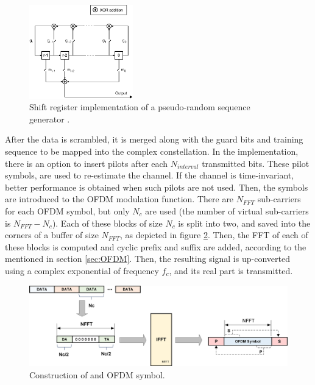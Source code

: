 \documentclass[12pt,a4paper,openright]{report}
\begin{document}
\begin{figure}[h]
  \centering
    \includegraphics[width=0.4\textwidth]{pnSeqGen.png}
    \caption[Shift register implementation of a pseudo-random sequence generator.]{Shift register implementation of a pseudo-random sequence generator \cite{MATLABpngen}.}
    \label{fig:PNgenerator}
\end{figure}


 
 After the data is scrambled, it is merged along with the guard bits and training sequence to be mapped into the complex constellation. In the implementation, there is an option to insert pilots after each $N_{interval}$ transmitted bits. These pilot symbols, are used to re-estimate the channel. If the channel is time-invariant, better performance is obtained when such pilots are not used. Then, the symbols are introduced to the OFDM modulation function. There are $N_{FFT}$ sub-carriers for each OFDM symbol, but only $N_c$ are used (the number of virtual sub-carriers is $N_{FFT}-N_c$). Each of these blocks of size $N_c$ is split into two, and saved into the corners of a buffer of size $N_{FFT}$, as depicted in figure \ref{fig:OFDMdata}. Then, the FFT of each of these blocks is computed and cyclic prefix and suffix are added, according to the mentioned in section \ref{sec:OFDM}. Then, the resulting signal is up-converted using a complex exponential of frequency  $f_c$, and its real part is transmitted.   

\begin{figure}[h]
  \centering
    \includegraphics[width=1\textwidth]{OFDMcAdaptTX.png}
    \caption[Construction of an OFDM symbol.]{Construction of and OFDM symbol.}
    \label{fig:OFDMdata}
\end{figure}
\end{document}
